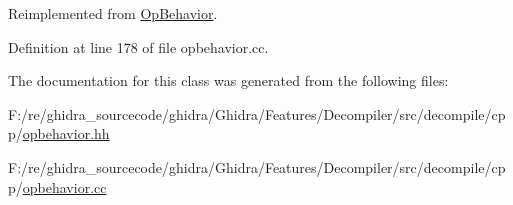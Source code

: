 Reimplemented from \mbox{\hyperlink{class_op_behavior_aeeed3af7aa35264b31a1f182884214a9}{Op\+Behavior}}.



Definition at line 178 of file opbehavior.\+cc.



The documentation for this class was generated from the following files\+:\begin{DoxyCompactItemize}
\item 
F\+:/re/ghidra\+\_\+sourcecode/ghidra/\+Ghidra/\+Features/\+Decompiler/src/decompile/cpp/\mbox{\hyperlink{opbehavior_8hh}{opbehavior.\+hh}}\item 
F\+:/re/ghidra\+\_\+sourcecode/ghidra/\+Ghidra/\+Features/\+Decompiler/src/decompile/cpp/\mbox{\hyperlink{opbehavior_8cc}{opbehavior.\+cc}}\end{DoxyCompactItemize}

